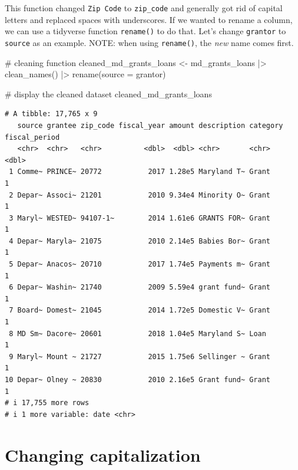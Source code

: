 \documentclass[
  letterpaper,
  DIV=11,
  numbers=noendperiod]{scrreprt}
\newenvironment{Shaded}{\begin{snugshade}}{\end{snugshade}}
\newcommand{\AttributeTok}[1]{\textcolor[rgb]{0.40,0.45,0.13}{#1}}
\newcommand{\CommentTok}[1]{\textcolor[rgb]{0.37,0.37,0.37}{#1}}
\newcommand{\FunctionTok}[1]{\textcolor[rgb]{0.28,0.35,0.67}{#1}}
\newcommand{\NormalTok}[1]{\textcolor[rgb]{0.00,0.23,0.31}{#1}}
\newcommand{\OtherTok}[1]{\textcolor[rgb]{0.00,0.23,0.31}{#1}}
\newcommand{\SpecialCharTok}[1]{\textcolor[rgb]{0.37,0.37,0.37}{#1}}
\begin{document}
This function changed \texttt{Zip\ Code} to \texttt{zip\_code} and
generally got rid of capital letters and replaced spaces with
underscores. If we wanted to rename a column, we can use a tidyverse
function \texttt{rename()} to do that. Let's change \texttt{grantor} to
\texttt{source} as an example. NOTE: when using \texttt{rename()}, the
\emph{new} name comes first.

\begin{Shaded}
\begin{Highlighting}[]
\CommentTok{\# cleaning function}
\NormalTok{cleaned\_md\_grants\_loans }\OtherTok{\textless{}{-}}\NormalTok{ md\_grants\_loans }\SpecialCharTok{|\textgreater{}}
  \FunctionTok{clean\_names}\NormalTok{() }\SpecialCharTok{|\textgreater{}} 
  \FunctionTok{rename}\NormalTok{(}\AttributeTok{source =}\NormalTok{ grantor)}

\CommentTok{\# display the cleaned dataset}
\NormalTok{cleaned\_md\_grants\_loans}
\end{Highlighting}
\end{Shaded}

\begin{verbatim}
# A tibble: 17,765 x 9
   source grantee zip_code fiscal_year amount description category fiscal_period
   <chr>  <chr>   <chr>          <dbl>  <dbl> <chr>       <chr>            <dbl>
 1 Comme~ PRINCE~ 20772           2017 1.28e5 Maryland T~ Grant                1
 2 Depar~ Associ~ 21201           2010 9.34e4 Minority O~ Grant                1
 3 Maryl~ WESTED~ 94107-1~        2014 1.61e6 GRANTS FOR~ Grant                1
 4 Depar~ Maryla~ 21075           2010 2.14e5 Babies Bor~ Grant                1
 5 Depar~ Anacos~ 20710           2017 1.74e5 Payments m~ Grant                1
 6 Depar~ Washin~ 21740           2009 5.59e4 grant fund~ Grant                1
 7 Board~ Domest~ 21045           2014 1.72e5 Domestic V~ Grant                1
 8 MD Sm~ Dacore~ 20601           2018 1.04e5 Maryland S~ Loan                 1
 9 Maryl~ Mount ~ 21727           2015 1.75e6 Sellinger ~ Grant                1
10 Depar~ Olney ~ 20830           2010 2.16e5 Grant fund~ Grant                1
# i 17,755 more rows
# i 1 more variable: date <chr>
\end{verbatim}

\hypertarget{changing-capitalization}{%
\section{Changing capitalization}\label{changing-capitalization}}
\end{document}
